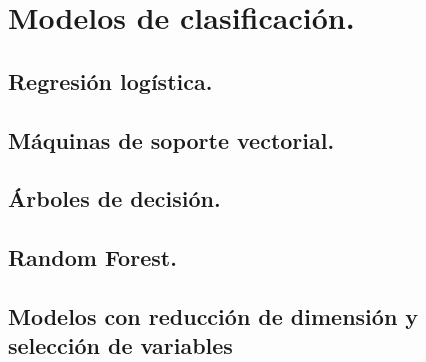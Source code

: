\pagebreak
\section{Modelos de clasificación.}

\subsection{Regresión logística.}

\subsection{Máquinas de soporte vectorial.}

\subsection{Árboles de decisión.}

\subsection{Random Forest.}

\subsection{Modelos con reducción de dimensión y selección de variables}